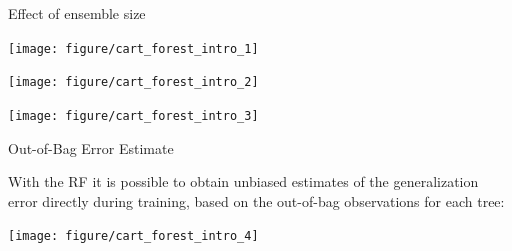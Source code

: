 \documentclass[11pt,compress,t,notes=noshow, xcolor=table]{beamer}
\newenvironment{knitrout}{}{} %
\begin{document}

\begin{vbframe}{Effect of ensemble size}
\begin{knitrout}\scriptsize
{}\color{fgcolor}

{\centering \texttt{[image: figure/cart\_forest\_intro\_1]} 

}

\end{knitrout}
\begin{knitrout}\scriptsize
{}\color{fgcolor}

{\centering \texttt{[image: figure/cart\_forest\_intro\_2]} 

}

\end{knitrout}
\begin{knitrout}\scriptsize
{}\color{fgcolor}

{\centering \texttt{[image: figure/cart\_forest\_intro\_3]} 

}

\end{knitrout}
\end{vbframe}

\begin{vbframe}{Out-of-Bag Error Estimate}

With the RF it is possible to obtain unbiased estimates of the generalization 
error directly during training, based on the out-of-bag observations for each 
tree:

\begin{knitrout}\scriptsize
{}\color{fgcolor}

{\centering \texttt{[image: figure/cart\_forest\_intro\_4]} 

}
\end{knitrout}

\end{vbframe}
\end{document}
